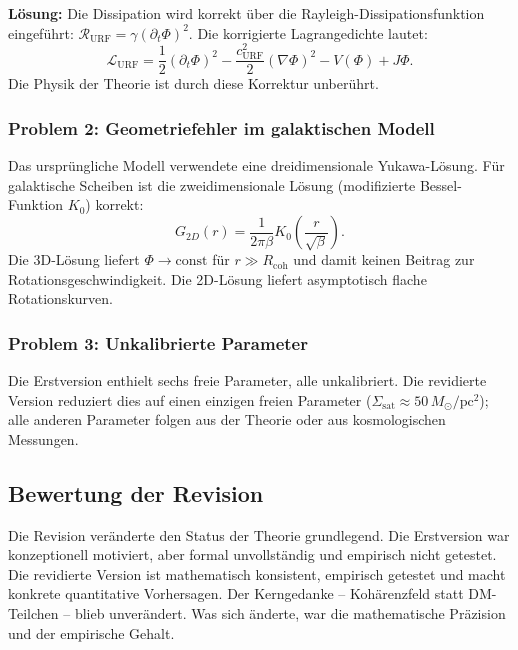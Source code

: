 \documentclass[12pt,a4paper]{article}
\theoremstyle{definition}
\begin{document}
\textbf{Lösung:} Die Dissipation wird korrekt über die
Rayleigh-Dissipationsfunktion eingeführt:
$\mathcal{R}_{\mathrm{URF}} = \gamma(\partial_t\Phi)^2$.
Die korrigierte Lagrangedichte lautet:
\begin{equation}
\mathcal{L}_{\mathrm{URF}} = \frac{1}{2}(\partial_t\Phi)^2
- \frac{c_{\mathrm{URF}}^2}{2}(\nabla\Phi)^2 - V(\Phi) + J\Phi.
\end{equation}
Die Physik der Theorie ist durch diese Korrektur unberührt.

\subsubsection{Problem 2: Geometriefehler im galaktischen Modell}

Das ursprüngliche Modell verwendete eine dreidimensionale Yukawa-Lösung.
Für galaktische Scheiben ist die zweidimensionale Lösung (modifizierte
Bessel-Funktion $K_0$) korrekt:
\begin{equation}
G_{2D}(r) = \frac{1}{2\pi\beta}K_0\!\left(\frac{r}{\sqrt{\beta}}\right).
\end{equation}
Die 3D-Lösung liefert $\Phi \to \mathrm{const}$ für $r \gg R_{\mathrm{coh}}$
und damit keinen Beitrag zur Rotationsgeschwindigkeit. Die 2D-Lösung
liefert asymptotisch flache Rotationskurven.

\subsubsection{Problem 3: Unkalibrierte Parameter}

Die Erstversion enthielt sechs freie Parameter, alle unkalibriert.
Die revidierte Version reduziert dies auf einen einzigen freien Parameter
($\Sigma_{\mathrm{sat}} \approx 50\,M_\odot/\mathrm{pc}^2$); alle anderen
Parameter folgen aus der Theorie oder aus kosmologischen Messungen.

\subsection{Bewertung der Revision}

Die Revision veränderte den Status der Theorie grundlegend. Die Erstversion
war konzeptionell motiviert, aber formal unvollständig und empirisch nicht
getestet. Die revidierte Version ist mathematisch konsistent, empirisch
getestet und macht konkrete quantitative Vorhersagen. Der Kerngedanke --
Kohärenzfeld statt DM-Teilchen -- blieb unverändert. Was sich änderte,
war die mathematische Präzision und der empirische Gehalt.
\end{document}
